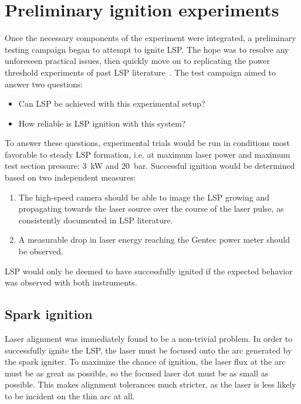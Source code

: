     \section{Preliminary ignition experiments} \label{sec:ignitiontest}
        Once the necessary components of the experiment were integrated, a preliminary testing campaign began to attempt to ignite LSP. The hope was to resolve any unforeseen practical issues, then quickly move on to replicating the power threshold experiments of past LSP literature~\cite{zimakovInteractionNearIRLaser2016,matsuiGeneratingConditionsArgon2019,luCharacteristicDiagnosticsLaserStabilized2022}. The test campaign aimed to answer two questions:
        \begin{itemize}
            \item Can LSP be achieved with this experimental setup?
            \item How reliable is LSP ignition with this system?
        \end{itemize}
        To answer these questions, experimental trials would be run in conditions most favorable to steady LSP formation, i.e. at maximum laser power and maximum test section pressure: \qty{3}{kW} and \qty{20}{bar}. Successful ignition would be determined based on two independent measures:
        \begin{enumerate}
            \item The high-speed camera should be able to image the LSP growing and propagating towards the laser source over the course of the laser pulse, as consistently documented in LSP literature.
            \item A measurable drop in laser energy reaching the Gentec power meter should be observed.
        \end{enumerate}
        LSP would only be deemed to have successfully ignited if the expected behavior was observed with both instruments.

        \subsection{Spark ignition} \label{subsec:results_sparkignition}
            Laser alignment was immediately found to be a non-trivial problem. In order to successfully ignite the LSP, the laser must be focused onto the arc generated by the spark igniter. To maximize the chance of ignition, the laser flux at the arc must be as great as possible, so the focused laser dot must be as small as possible. This makes alignment tolerances much stricter, as the laser is less likely to be incident on the thin arc at all.

